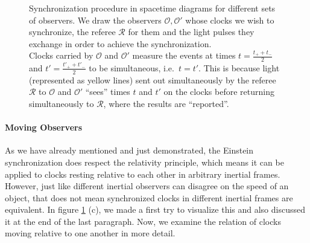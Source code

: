 \begin{figure}
\begin{minipage}{0.5\textwidth}
{
		}
	\end{minipage}%
	\begin{minipage}{0.5\textwidth}
		\caption[Synchronization procedure in spacetime diagrams for different sets of observers]{Synchronization procedure in spacetime diagrams for different sets of observers. We draw the observers $\mathcal{O}, \mathcal{O}'$ whose clocks we wish to synchronize, the referee $\mathcal{R}$ for them and the light pulses they exchange in order to achieve the synchronization.\\
		Clocks carried by $\mathcal{O}$ and $\mathcal{O}'$ measure the events at times $t = \frac{t_+ + t_-}{2}$ and $t' = \frac{t'_+ + t'_-}{2}$ to be simultaneous, i.e.~$t = t'$. This is because light (represented as yellow lines) sent out simultaneously by the referee $\mathcal{R}$ to $\mathcal{O}$ and $\mathcal{O}'$ \enquote{sees} times $t$ and $t'$ on the clocks before returning simultaneously to $\mathcal{R}$, where the results are \enquote{reported}.}
		\label{fig:clocks_at_rest_wrt_each_other}
	\end{minipage}
\end{figure}



			\paragraph{Moving Observers}
As we have already mentioned and just demonstrated, the Einstein synchronization does respect the relativity principle, which means it can be applied to clocks resting relative to each other in arbitrary inertial frames. However, just like different inertial observers can disagree on the speed of an object, that does not mean synchronized clocks in different inertial frames are equivalent. In figure \ref{fig:clocks_at_rest_wrt_each_other} (c), we made a first try to visualize this and also discussed it at the end of the last paragraph. Now, we examine the relation of clocks moving relative to one another in more detail.



